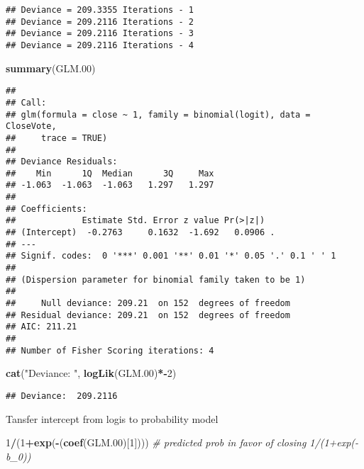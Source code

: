 \documentclass[
]{article}
\newenvironment{Shaded}{\begin{snugshade}}{\end{snugshade}}
\newcommand{\CommentTok}[1]{\textcolor[rgb]{0.56,0.35,0.01}{\textit{#1}}}
\newcommand{\DecValTok}[1]{\textcolor[rgb]{0.00,0.00,0.81}{#1}}
\newcommand{\FloatTok}[1]{\textcolor[rgb]{0.00,0.00,0.81}{#1}}
\newcommand{\KeywordTok}[1]{\textcolor[rgb]{0.13,0.29,0.53}{\textbf{#1}}}
\newcommand{\NormalTok}[1]{#1}
\newcommand{\OperatorTok}[1]{\textcolor[rgb]{0.81,0.36,0.00}{\textbf{#1}}}
\newcommand{\StringTok}[1]{\textcolor[rgb]{0.31,0.60,0.02}{#1}}
\begin{document}
\begin{verbatim}
## Deviance = 209.3355 Iterations - 1
## Deviance = 209.2116 Iterations - 2
## Deviance = 209.2116 Iterations - 3
## Deviance = 209.2116 Iterations - 4
\end{verbatim}

\begin{Shaded}
\begin{Highlighting}[]
\KeywordTok{summary}\NormalTok{(GLM}\FloatTok{.00}\NormalTok{)}
\end{Highlighting}
\end{Shaded}

\begin{verbatim}
## 
## Call:
## glm(formula = close ~ 1, family = binomial(logit), data = CloseVote, 
##     trace = TRUE)
## 
## Deviance Residuals: 
##    Min      1Q  Median      3Q     Max  
## -1.063  -1.063  -1.063   1.297   1.297  
## 
## Coefficients:
##             Estimate Std. Error z value Pr(>|z|)  
## (Intercept)  -0.2763     0.1632  -1.692   0.0906 .
## ---
## Signif. codes:  0 '***' 0.001 '**' 0.01 '*' 0.05 '.' 0.1 ' ' 1
## 
## (Dispersion parameter for binomial family taken to be 1)
## 
##     Null deviance: 209.21  on 152  degrees of freedom
## Residual deviance: 209.21  on 152  degrees of freedom
## AIC: 211.21
## 
## Number of Fisher Scoring iterations: 4
\end{verbatim}

\begin{Shaded}
\begin{Highlighting}[]
\KeywordTok{cat}\NormalTok{(}\StringTok{"Deviance: "}\NormalTok{, }\KeywordTok{logLik}\NormalTok{(GLM}\FloatTok{.00}\NormalTok{)}\OperatorTok{*-}\DecValTok{2}\NormalTok{)}
\end{Highlighting}
\end{Shaded}

\begin{verbatim}
## Deviance:  209.2116
\end{verbatim}

Tansfer intercept from logis to probability model

\begin{Shaded}
\begin{Highlighting}[]
\DecValTok{1}\OperatorTok{/}\NormalTok{(}\DecValTok{1}\OperatorTok{+}\KeywordTok{exp}\NormalTok{(}\OperatorTok{-}\NormalTok{(}\KeywordTok{coef}\NormalTok{(GLM}\FloatTok{.00}\NormalTok{)[}\DecValTok{1}\NormalTok{])))            }\CommentTok{# predicted prob in favor of closing 1/(1+exp(-b_0)) }
\end{Highlighting}
\end{Shaded}
\end{document}
